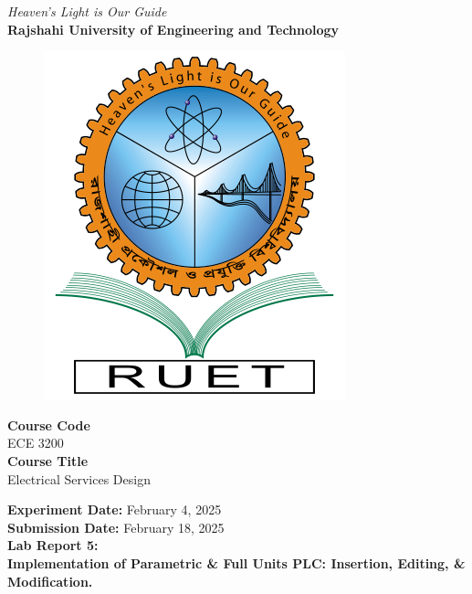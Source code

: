 \vspace*{\fill}
\begin{center}

    \emph{Heaven's Light is Our Guide} \\
    \textbf{Rajshahi University of Engineering and Technology} \\

    \begin{figure}[H]
        \centering
        \includegraphics[scale=.34]{images/RUET_logo.png}
        \label{fig:ruet_logo}
    \end{figure}
    \vspace{5mm}

    \textbf{Course Code}\\
    ECE 3200\\
    \vspace{3mm}
    \textbf{Course Title}\\
    Electrical Services Design

    \vspace{5mm}
    \textbf{Experiment Date:} {February 4, 2025}\\
    \textbf{Submission Date:} {February 18, 2025}\\

    \vspace{5mm}
    \textbf{Lab Report 5: \\ Implementation of Parametric \& Full Units PLC: Insertion, Editing, \& Modification.}

    \vspace{15mm}


\end{center}
